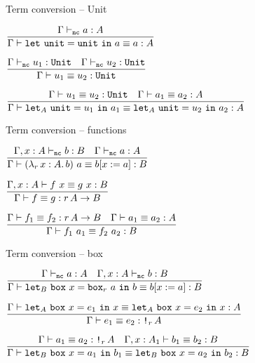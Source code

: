 \begin{frame}{Term conversion -- Unit}

\begin{center}
  $\infrule{\typing[\Gamma][\noncomputable]{a}{A}}{\termconv{\unitelim{\unit}{a}}{a}{A}}$

  \vspace{2em}

  $\infrule{\typing[\Gamma][\noncomputable]{u_1}{\Unit} \quad \typing[\Gamma][\noncomputable]{u_2}{\Unit}}{\termconv[\Gamma]{u_1}{u_2}{\Unit}}$

  \vspace{2em}

  $\infrule{\termconv{u_1}{u_2}{\Unit} \quad \termconv{a_1}{a_2}{A}}{\termconv{\unitelim{u_1}{a_1}[A]}{\unitelim{u_2}{a_2}[A]}{A}}$
\end{center}

\end{frame}

\begin{frame}{Term conversion -- functions}

\begin{center}
  $\infrule{\typing[\extend{\Gamma}{x}{A}][\noncomputable]{b}{B} \quad \typing[\Gamma][\noncomputable]{a}{A}}{\termconv{\app{(\fun[r]{x}[A]{b})}{a}}{\subst{b}{x}{a}}{B}}$

  \vspace{2em}

  $\infrule{\termconv[\extend{\Gamma}{x}{A}]{\app{f}{x}}{\app{g}{x}}{B}}{\termconv[\Gamma]{f}{g}{\Fun[r]{A}{B}}}$

  \vspace{2em}

  $\infrule{\termconv{f_1}{f_2}{\Fun[r]{A}{B}} \quad \termconv{a_1}{a_2}{A}}{\termconv{\app{f_1}{a_1}}{\app{f_2}{a_2}}{B}}$
\end{center}

\end{frame}

\begin{frame}{Term conversion -- box}

\begin{center}
  $\infrule{\typing[\Gamma][\noncomputable]{a}{A} \quad \typing[\extend{\Gamma}{x}{A}][\noncomputable]{b}{B}}{\termconv{\boxelim{x}{\boxintro[r]{a}}{b}[B]}{\subst{b}{x}{a}}{B}}$

  \vspace{2em}

  $\infrule{\termconv{\boxelim{x}{e_1}{x}[A]}{\boxelim{x}{e_2}{x}[A]}{A}}{\termconv{e_1}{e_2}{\Box[r]{A}}}$

  \vspace{2em}

  $\infrule{\termconv{a_1}{a_2}{\Box[r]{A}} \quad \termconv[\extend{\Gamma}{x}{A_1}]{b_1}{b_2}{B}}{\termconv{\boxelim{x}{a_1}{b_1}[B]}{\boxelim{x}{a_2}{b_2}[B]}{B}}$
\end{center}

\end{frame}

